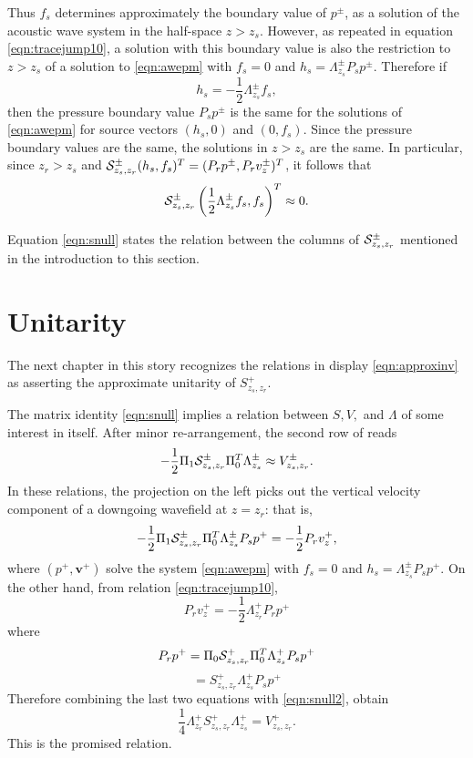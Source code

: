 \documentclass[georeport,12pt]{geophysics}
\newcommand{\bv}{\mathbf{v}}
\begin{document}
Thus $f_s$ determines approximately the boundary value of $p^{\pm}$,
as a solution of the acoustic wave system in the half-space
$z>z_s$. However, as repeated in equation \ref{eqn:tracejump10}, a
solution with this boundary value is also the restriction to $z>z_s$
of a solution to \ref{eqn:awepm} with $f_s=0$ and $h_s=
\Lambda^{\pm}_{z_s}P_sp^{\pm}$. Therefore if
\begin{equation}
  \label{eqn:hfcondn}
  h_s =-\frac{1}{2}\Lambda^{\pm}_{z_s}f_s,
\end{equation}
then the pressure boundary value $P_sp^{\pm}$ is the
same for the solutions of \ref{eqn:awepm} for source vectors $(h_s,0)$
and $(0,f_s)$. Since the pressure boundary values are the same, the solutions
in $z>z_s$ are the same. In particular, since $z_r>z_s$ and ${\cal
  S}^{\pm}_{z_s,z_r}(h_s,f_s)^T = (P_rp^{\pm},P_rv^{\pm}_z)^T$, it follows
that
\begin{equation}
  \label{eqn:snull}
  {\cal S}^{\pm}_{z_s,z_r}\left(\frac{1}{2}\Lambda^{\pm}_{z_s}f_s,f_s\right)^T \approx 0.
\end{equation}

Equation \ref{eqn:snull} states the relation between the columns of $
{\cal S}^{\pm}_{z_s,z_r}$ mentioned in the introduction to this
section.



\section{Unitarity}

The next chapter in this story recognizes the relations in display
\ref{eqn:approxinv} as asserting the approximate unitarity of
$S^+_{z_s,z_r}$.

The matrix identity \ref{eqn:snull} implies a relation between $S, V,$
and $\Lambda$ of some interest in itself. After minor re-arrangement, the second row of reads
\begin{equation}
  \label{eqn:snull2}
-\frac{1}{2}\Pi_1{\cal S}^{\pm}_{z_s,z_r}\Pi_0^T\Lambda^{\pm}_{z_s}  \approx
V^{\pm}_{z_s,z_r}.
\end{equation}
In these relations, the projection on the left picks out the vertical velocity component
of a downgoing wavefield at $z=z_r$: that is,
\[
-\frac{1}{2}\Pi_1{\cal S}^{\pm}_{z_s,z_r}\Pi_0^T\Lambda^{\pm}_{z_s}P_sp^+
=-\frac{1}{2}P_r v_z^+,
\]
where $(p^+, \bv^+)$ solve the system \ref{eqn:awepm} with $f_s=0$ and
$h_s = \Lambda^{\pm}_{z_s}P_sp^+$. On the other hand, from relation
\ref{eqn:tracejump10},
\[
  P_r v_z^+ = -\frac{1}{2}\Lambda^+_{z_r}P_r p^+
\]
where
\[
  P_r p^+ = \Pi_0{\cal S}^{+}_{z_s,z_r}\Pi_0^T\Lambda^{+}_{z_s}P_s
  p^+
\]
\[
  = S^+_{z_s,z_r}\Lambda^{+}_{z_s}P_sp^+
\]
Therefore combining the last two equations with \ref{eqn:snull2},
obtain
\begin{equation}
  \label{eqn:sv}
  \frac{1}{4}\Lambda^+_{z_r}S^+_{z_s,z_r}\Lambda^{+}_{z_s} = V^+_{z_s,z_r}.
\end{equation}
This is the promised relation.
\end{document}
